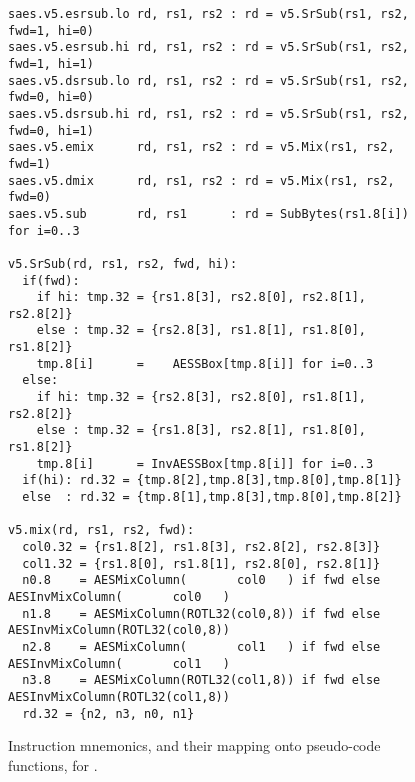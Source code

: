 \begin{figure}[!h]
\begin{lstlisting}[language=pseudo,style=block]
saes.v5.esrsub.lo rd, rs1, rs2 : rd = v5.SrSub(rs1, rs2, fwd=1, hi=0)
saes.v5.esrsub.hi rd, rs1, rs2 : rd = v5.SrSub(rs1, rs2, fwd=1, hi=1)
saes.v5.dsrsub.lo rd, rs1, rs2 : rd = v5.SrSub(rs1, rs2, fwd=0, hi=0)
saes.v5.dsrsub.hi rd, rs1, rs2 : rd = v5.SrSub(rs1, rs2, fwd=0, hi=1)
saes.v5.emix      rd, rs1, rs2 : rd = v5.Mix(rs1, rs2, fwd=1)
saes.v5.dmix      rd, rs1, rs2 : rd = v5.Mix(rs1, rs2, fwd=0)
saes.v5.sub       rd, rs1      : rd = SubBytes(rs1.8[i])         for i=0..3

v5.SrSub(rd, rs1, rs2, fwd, hi):
  if(fwd):
    if hi: tmp.32 = {rs1.8[3], rs2.8[0], rs2.8[1], rs2.8[2]}
    else : tmp.32 = {rs2.8[3], rs1.8[1], rs1.8[0], rs1.8[2]}
    tmp.8[i]      =    AESSBox[tmp.8[i]] for i=0..3
  else:
    if hi: tmp.32 = {rs2.8[3], rs2.8[0], rs1.8[1], rs2.8[2]}
    else : tmp.32 = {rs1.8[3], rs2.8[1], rs1.8[0], rs1.8[2]}
    tmp.8[i]      = InvAESSBox[tmp.8[i]] for i=0..3
  if(hi): rd.32 = {tmp.8[2],tmp.8[3],tmp.8[0],tmp.8[1]}
  else  : rd.32 = {tmp.8[1],tmp.8[3],tmp.8[0],tmp.8[2]}

v5.mix(rd, rs1, rs2, fwd):
  col0.32 = {rs1.8[2], rs1.8[3], rs2.8[2], rs2.8[3]}
  col1.32 = {rs1.8[0], rs1.8[1], rs2.8[0], rs2.8[1]}
  n0.8    = AESMixColumn(       col0   ) if fwd else AESInvMixColumn(       col0   )
  n1.8    = AESMixColumn(ROTL32(col0,8)) if fwd else AESInvMixColumn(ROTL32(col0,8))
  n2.8    = AESMixColumn(       col1   ) if fwd else AESInvMixColumn(       col1   )
  n3.8    = AESMixColumn(ROTL32(col1,8)) if fwd else AESInvMixColumn(ROTL32(col1,8))
  rd.32 = {n2, n3, n0, n1}
\end{lstlisting}
\caption{
  Instruction mnemonics, and their mapping onto pseudo-code functions, for .
}
\label{fig:v5:pseudo}
\end{figure}
